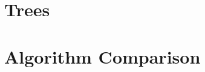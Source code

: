 \documentclass[11pt,a4paper]{article}
\begin{document}





\newpage
\section{Trees}







\newpage
\section{Algorithm Comparison}






\newpage


% 
% 
% 
% 
% 
% 
% 
% 
% 
% 
% 
% 
% 


% 
% 
% 
% 

%
%
%
%
%
%
%
%
%

% 

% 

% 
\end{document}
